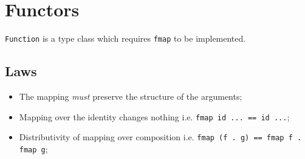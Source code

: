 \section{Functors}

\texttt{Function} is a type class which requires \texttt{fmap} to be implemented.


\subsection{Laws}
\begin{itemize}
  \item The mapping \textit{must} preserve the structure of the arguments;
  \item Mapping over the identity changes nothing i.e. \texttt{fmap id ... == id ...};
  \item Distributivity of mapping over composition i.e. \texttt{fmap (f . g) == fmap f . fmap g};
\end{itemize}
